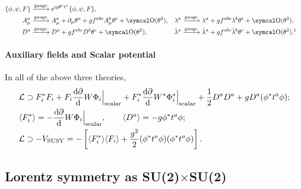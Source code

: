 \documentclass[CheatSheet]{subfiles}
\begin{document}
\begin{align*}
   \{\phi,\psi,F\}&\xrightarrow{\text{gauge}} \ee^{\ii g \theta^at^a}\{\phi,\psi,F\},\\
   A_\mu^a&\xrightarrow{\text{gauge}} A^a_\mu+\partial_\mu \theta^a
   + g f^{abc}A_\mu^b\theta^c  + \Order(\theta^2),
 &\lambda^a&\xrightarrow{\text{gauge}}\lambda^a+gf^{abc}\lambda^b\theta^c+\Order(\theta^2),
 \\
 D^a&\xrightarrow{\text{gauge}} D^a+gf^{abc}D^b\theta^c+\Order(\theta^2),
& \blambda^a&\xrightarrow{\text{gauge}}\blambda^a+gf^{abc}\blambda^b\theta^c + \Order(\theta^2).
\footnotemark
\end{align*}

\paragraph{Auxiliary fields and Scalar potential}
In all of the above three theories,
\begin{align}
& \mathcal L\supset
F^*_i F_i
+ F_i\pdiff{W}{\Phi_i}\Big|\w{scalar}
+ F_i^*\pdiff{W^*}{\Phi_i^*}\Big|\w{scalar}
+\frac12 D^aD^a + g D^a(\phi^*t^a\phi);
\\&
 \mean{F^*_i} = -\pdiff{W}{\Phi_i}\Big|\w{scalar},\qquad
 \mean{D^a} = -g\phi^*t^a\phi;
\\&
 \mathcal L\supset -V\w{SUSY} = -
\left[\mean{F^*_i}\mean{F_i}+\frac{g^2}2 (\phi^*t^a\phi)(\phi^*t^a\phi)\right].
\end{align}



\clearpage
\detailstyle

\subsection[Lorentz symmetry as SU(2) x SU(2)]{Lorentz symmetry as SU(2)$\times$SU(2)}
\end{document}
